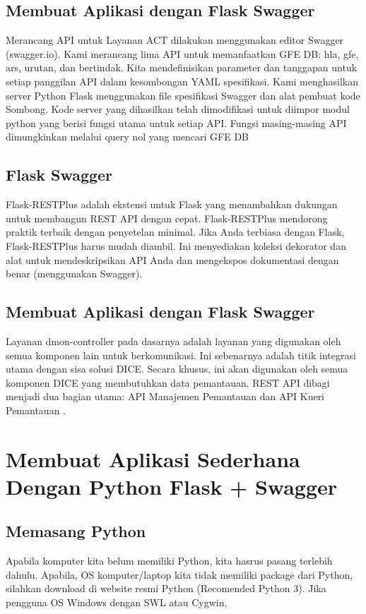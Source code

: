 \documentclass[12pt]{article}
\begin{document}
\subsection{Membuat Aplikasi dengan Flask Swagger}
Merancang API untuk Layanan ACT dilakukan menggunakan editor Swagger (swagger.io).
Kami merancang lima API untuk memanfaatkan GFE DB: hla, gfe, ars, urutan, dan bertindak. Kita
mendefinisikan parameter dan tanggapan untuk setiap panggilan API dalam kesombongan YAML
spesifikasi. Kami menghasilkan server Python Flask menggunakan file spesifikasi Swagger
dan alat pembuat kode Sombong. Kode server yang dihasilkan telah dimodifikasi untuk diimpor
modul python yang berisi fungsi utama untuk setiap API. Fungsi masing-masing
API dimungkinkan melalui query nol yang mencari GFE DB \cite{halagan2017bioinformatics}

\subsection{Flask Swagger}
Flask-RESTPlus adalah ekstensi untuk Flask yang menambahkan dukungan untuk membangun REST API dengan cepat. Flask-RESTPlus mendorong praktik terbaik dengan penyetelan minimal. Jika Anda terbiasa dengan Flask, Flask-RESTPlus harus mudah diambil. Ini menyediakan koleksi dekorator dan alat untuk mendeskripsikan API Anda dan mengekspos dokumentasi dengan benar (menggunakan Swagger)\cite{buhler2017design}.

\subsection{Membuat Aplikasi dengan Flask Swagger}
Layanan dmon-controller pada dasarnya adalah layanan yang digunakan oleh semua komponen lain untuk berkomunikasi. Ini sebenarnya adalah titik integrasi utama dengan sisa solusi DICE. Secara khusus, ini akan digunakan oleh semua komponen DICE yang membutuhkan data pemantauan. REST API dibagi menjadi dua bagian utama: API Manajemen Pemantauan dan API Kueri Pemantauan \cite{pop2016monitoring}.

\section{Membuat Aplikasi Sederhana Dengan Python Flask + Swagger}

\subsection{Memasang Python}
Apabila komputer kita belum memiliki Python, kita hasrus pasang terlebih dahulu. Apabila, OS komputer/laptop kita tidak memiliki package dari Python, silahkan download di website resmi Python (Recomended Python 3). Jika pengguna OS Windows dengan SWL atau Cygwin,
\end{document}
